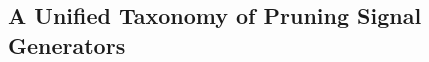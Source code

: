 \documentclass[11pt]{article}
\theoremstyle{plain}
\newtheorem{type}{Type}
\newtheorem{desideratum}{Desideratum}
\begin{document}














\subsection{A Unified Taxonomy of Pruning Signal Generators}
\label{sec:taxonomy}
\end{document}
